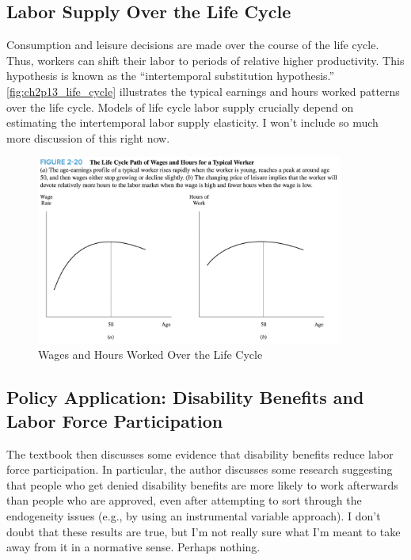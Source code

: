 \FloatBarrier

\subsection{Labor Supply Over the Life Cycle}

Consumption and leisure decisions are made over the course of the life cycle. 
Thus, workers can shift their labor to periods of relative higher productivity.
This hypothesis is known as the ``intertemporal substitution hypothesis.''
\autoref{fig:ch2p13_life_cycle} illustrates the typical earnings and hours worked
patterns over the life cycle. Models of life cycle labor supply
crucially depend on estimating the intertemporal 
labor supply elasticity. I won't include so much more discussion of this 
right now.

\FloatBarrier

\begin{figure}[!htb]
    \centering
        \includegraphics[width=0.9\textwidth]{../input/ch_2p13_life_cycle.png}
    \caption{Wages and Hours Worked Over the Life Cycle}
    \label{fig:ch2p13_life_cycle}
\end{figure}

\FloatBarrier

\subsection{Policy Application: Disability Benefits and Labor Force Participation}

The textbook then discusses some evidence that 
disability benefits reduce labor force participation.
In particular, the author discusses some research suggesting that people 
who get denied disability benefits are more likely to work
afterwards than people who are approved, even 
after attempting to sort through the endogeneity 
issues (e.g., by using an instrumental variable approach).
I don't doubt that these results are true, but I'm not really sure 
what I'm meant to take away from it in a normative sense. Perhaps nothing.